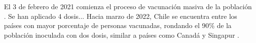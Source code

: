 El 3 de febrero de 2021 comienza el proceso de vacunación masiva de la población \cite{MINSAL2021}. Se han aplicado 4 dosis... Hacia marzo de 2022, Chile se encuentra entre los países con mayor porcentaje de personas vacunadas, rondando el 90\% de la población inoculada con dos dosis, similar a países como Canadá y Singapur \cite{Mathieu2021}.


